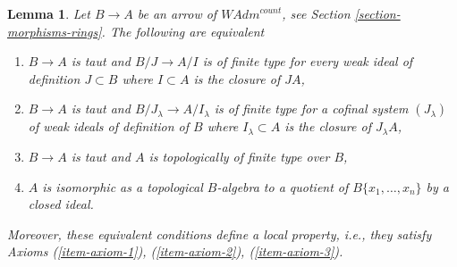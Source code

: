 \documentclass{stacks-project}
\theoremstyle{plain}
\newtheorem{lemma}[subsection]{Lemma}
\theoremstyle{definition}
\theoremstyle{remark}
\numberwithin{equation}{subsection}
\begin{document}
\begin{lemma}
\label{lemma-quotient-restricted-power-series}
Let $B \to A$ be an arrow of $\textit{WAdm}^{count}$, see
Section \ref{section-morphisms-rings}.
The following are equivalent
\begin{enumerate}
\item[(a)] $B \to A$ is taut and $B/J \to A/I$ is of finite type for
every weak ideal of definition $J \subset B$ where $I \subset A$ is the
closure of $JA$,
\item[(b)] $B \to A$ is taut and $B/J_\lambda \to A/I_\lambda$
is of finite type for a cofinal system $(J_\lambda)$
of weak ideals of definition of $B$ where
$I_\lambda \subset A$ is the closure of $J_\lambda A$,
\item[(c)] $B \to A$ is taut and $A$ is topologically of finite
type over $B$,
\item[(d)] $A$ is isomorphic as a topological $B$-algebra to a quotient of
$B\{x_1, \ldots, x_n\}$ by a closed ideal.
\end{enumerate}
Moreover, these equivalent conditions define a local property,
i.e., they satisfy
Axioms (\ref{item-axiom-1}), (\ref{item-axiom-2}), (\ref{item-axiom-3}).
\end{lemma}
\end{document}
